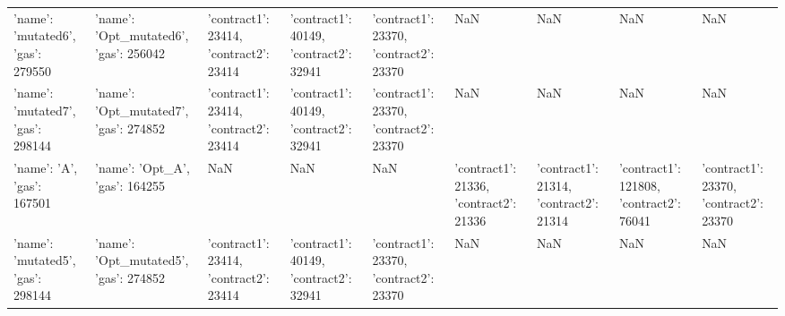 \begin{tabular}{lllllllll}
{'name': 'mutated6', 'gas': 279550} & {'name': 'Opt_mutated6', 'gas': 256042} & {'contract1': 23414, 'contract2': 23414} & {'contract1': 40149, 'contract2': 32941} & {'contract1': 23370, 'contract2': 23370} & NaN & NaN & NaN & NaN \\
{'name': 'mutated7', 'gas': 298144} & {'name': 'Opt_mutated7', 'gas': 274852} & {'contract1': 23414, 'contract2': 23414} & {'contract1': 40149, 'contract2': 32941} & {'contract1': 23370, 'contract2': 23370} & NaN & NaN & NaN & NaN \\
{'name': 'A', 'gas': 167501} & {'name': 'Opt_A', 'gas': 164255} & NaN & NaN & NaN & {'contract1': 21336, 'contract2': 21336} & {'contract1': 21314, 'contract2': 21314} & {'contract1': 121808, 'contract2': 76041} & {'contract1': 23370, 'contract2': 23370} \\
{'name': 'mutated5', 'gas': 298144} & {'name': 'Opt_mutated5', 'gas': 274852} & {'contract1': 23414, 'contract2': 23414} & {'contract1': 40149, 'contract2': 32941} & {'contract1': 23370, 'contract2': 23370} & NaN & NaN & NaN & NaN \\
\bottomrule
\end{tabular}
